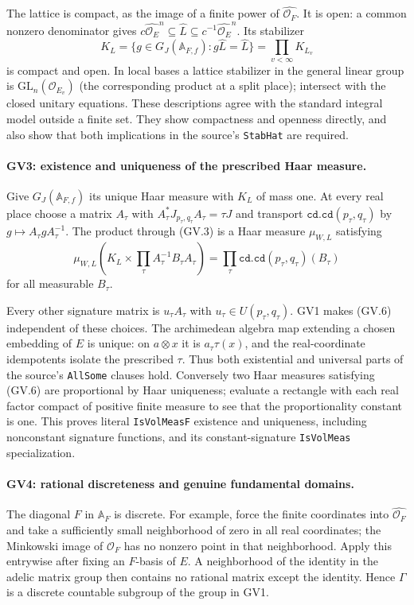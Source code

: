 The lattice is compact, as the image of a finite power of
$\widehat{\mathcal O_F}$. It is open: a common nonzero denominator
gives
$c\widehat{\mathcal O_E}^{n}\subseteq\widehat L
 \subseteq c^{-1}\widehat{\mathcal O_E}^{n}$.
Its stabilizer
\[
 K_L=\{g\in G_J(\mathbb A_{F,f}):g\widehat L=\widehat L\}
      =\prod_{v<\infty}K_{L_v}
 \tag{GV.5}
\]
is compact and open. In local bases a lattice stabilizer in the general
linear group is $\mathrm{GL}_n(\mathcal O_{E_v})$ (the corresponding
product at a split place); intersect with the closed unitary equations.
These descriptions agree with the standard integral model outside a
finite set. They show compactness and openness directly, and also show
that both implications in the source's \texttt{StabHat} are required.

\paragraph{GV3: existence and uniqueness of the prescribed Haar measure.}
Give $G_J(\mathbb A_{F,f})$ its unique Haar measure with
$K_L$ of mass one. At every real place choose a matrix
$A_\tau$ with
$A_\tau^*J_{p_\tau,q_\tau}A_\tau=\tau J$ and transport
$\texttt{cd.cd}(p_\tau,q_\tau)$ by $g\mapsto A_\tau gA_\tau^{-1}$.
The product through (GV.3) is a Haar measure $\mu_{W,L}$ satisfying
\[
 \mu_{W,L}\left(K_L\times\prod_\tau A_\tau^{-1}B_\tau A_\tau\right)
                    =\prod_\tau\texttt{cd.cd}(p_\tau,q_\tau)(B_\tau)
 \tag{GV.6}
\]
for all measurable $B_\tau$.

Every other signature matrix is $u_\tau A_\tau$ with
$u_\tau\in U(p_\tau,q_\tau)$. GV1 makes (GV.6) independent of these
choices. The archimedean algebra map extending a chosen embedding of
$E$ is unique: on $a\otimes x$ it is $a_\tau\tau(x)$, and the
real-coordinate idempotents isolate the prescribed $\tau$.
Thus both existential and universal parts of the source's
\texttt{AllSome} clauses hold. Conversely two Haar measures satisfying
(GV.6) are proportional by Haar uniqueness; evaluate a rectangle with
each real factor compact of positive finite measure to see that the
proportionality constant is one. This proves literal
\texttt{IsVolMeasF} existence and uniqueness, including nonconstant
signature functions, and its constant-signature \texttt{IsVolMeas}
specialization.

\paragraph{GV4: rational discreteness and genuine fundamental domains.}
The diagonal $F$ in $\mathbb A_F$ is discrete. For example, force the
finite coordinates into $\widehat{\mathcal O_F}$ and take a sufficiently
small neighborhood of zero in all real coordinates; the Minkowski
image of $\mathcal O_F$ has no nonzero point in that neighborhood.
Apply this entrywise after fixing an $F$-basis of $E$. A neighborhood
of the identity in the adelic matrix group then contains no rational
matrix except the identity. Hence $\Gamma$ is a discrete countable
subgroup of the group in GV1.

